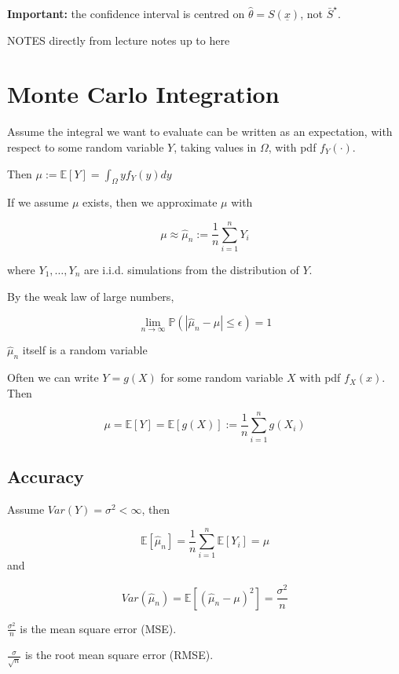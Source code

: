 \begin{remark}
	\textbf{Important:} the confidence interval is centred on $\hat{\theta} = S(\underline{x})$, not $\bar{S}^{\star}$.
\end{remark}

NOTES directly from lecture notes up to here

\section{Monte Carlo Integration}

Assume the integral we want to evaluate can be written as an expectation, with respect to some random variable $Y$, taking values in $\Omega$, with pdf $f_Y(\cdot)$.

Then $\mu := \mathbb{E}[Y] = \int_{\Omega} y f_Y(y)dy$

If we assume $\mu$ exists, then we approximate $\mu$ with 

\[\mu \approx \hat{\mu}_n := \frac{1}{n} \sum_{i = 1}^{n} Y_i\]

where $Y_1, \dots, Y_n$ are i.i.d. simulations from the distribution of $Y$.

By the weak law of large numbers,

\[\lim_{n \rightarrow \infty} \mathbb{P}(|\hat{\mu}_n - \mu| \le \epsilon) = 1\]

\begin{remark}
	$\hat{\mu}_n$ itself is a random variable
\end{remark}

Often we can write $Y = g(X)$ for some random variable $X$ with pdf $f_X(x)$. Then

\[\mu = \mathbb{E}[Y] = \mathbb{E}[g(X)] := \frac{1}{n} \sum_{i = 1}^{n} g(X_i)\]

\subsection{Accuracy}

Assume $Var(Y) = \sigma^2 < \infty$, then

\[\mathbb{E}[\hat{\mu}_n] = \frac{1}{n} \sum_{i = 1}^{n} \mathbb{E}[Y_i] = \mu\] and 

\[Var(\hat{\mu}_n) = \mathbb{E}[{(\hat{\mu}_n - \mu)} ^ 2] = \frac{\sigma^2}{n}\]

$\frac{\sigma^2}{n}$ is the mean square error (MSE).

$\frac{\sigma}{\sqrt{n}}$ is the root mean square error (RMSE).

